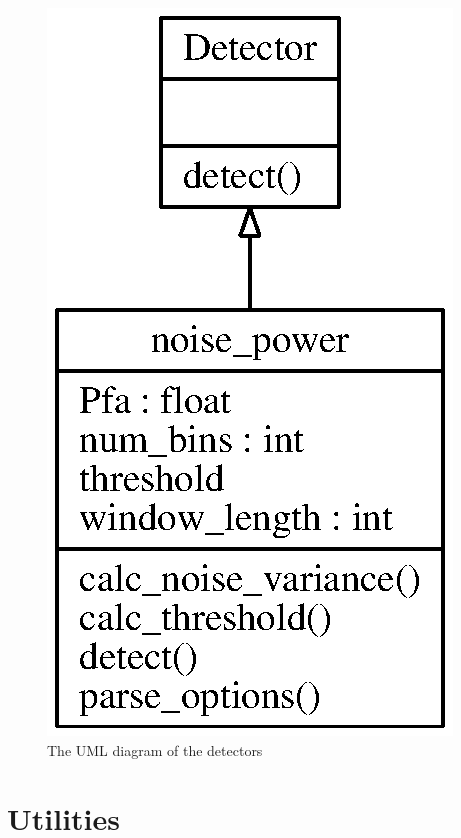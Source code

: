 \documentclass[a4paper, openany, oneside]{memoir}
\begin{document}
\begin{figure}
    \centering
    \includegraphics{./figures/classes_detection.eps}
    \caption{The UML diagram of the detectors}
    \label{fig:umldetector}
\end{figure}

\section{Utilities}
\label{sec:utilities}
\end{document}
